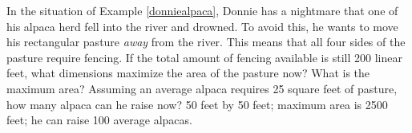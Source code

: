 {In the situation of Example \ref{donniealpaca}, Donnie has a nightmare that one of his alpaca herd fell into the river and drowned.  To avoid this, he wants to move his rectangular pasture \textit{away} from the river.  This means that all four sides of the pasture require fencing.  If the total amount of fencing available is still 200 linear feet, what dimensions maximize the area of the pasture now?  What is the maximum area?  Assuming an average alpaca requires 25 square feet of pasture, how many alpaca can he raise now?}
{50 feet by 50 feet;  maximum area is 2500 feet;  he can raise 100 average alpacas. }